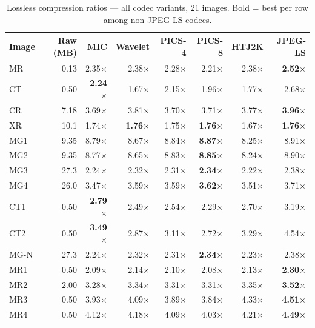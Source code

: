 \documentclass[journal]{IEEEtran}
\begin{document}
\begin{table}[t]
\centering
\caption{Lossless compression ratios --- all codec variants, 21 images. Bold = best per row among non-JPEG-LS codecs.}
\label{tab:ratios}
\begin{tabular}{lrrrrrrr}
\toprule
Image & Raw (MB) & MIC & Wavelet & PICS-4 & PICS-8 & HTJ2K & JPEG-LS \\
\midrule
MR   & 0.13 & 2.35$\times$ & 2.38$\times$ & 2.28$\times$ & 2.21$\times$ & 2.38$\times$ & \textbf{2.52$\times$} \\
CT   & 0.50 & \textbf{2.24$\times$} & 1.67$\times$ & 2.15$\times$ & 1.96$\times$ & 1.77$\times$ & 2.68$\times$ \\
CR   & 7.18 & 3.69$\times$ & 3.81$\times$ & 3.70$\times$ & 3.71$\times$ & 3.77$\times$ & \textbf{3.96$\times$} \\
XR   & 10.1 & 1.74$\times$ & \textbf{1.76$\times$} & 1.75$\times$ & \textbf{1.76$\times$} & 1.67$\times$ & \textbf{1.76$\times$} \\
MG1  & 9.35 & 8.79$\times$ & 8.67$\times$ & 8.84$\times$ & \textbf{8.87$\times$} & 8.25$\times$ & 8.91$\times$ \\
MG2  & 9.35 & 8.77$\times$ & 8.65$\times$ & 8.83$\times$ & \textbf{8.85$\times$} & 8.24$\times$ & 8.90$\times$ \\
MG3  & 27.3 & 2.24$\times$ & 2.32$\times$ & 2.31$\times$ & \textbf{2.34$\times$} & 2.22$\times$ & 2.38$\times$ \\
MG4  & 26.0 & 3.47$\times$ & 3.59$\times$ & 3.59$\times$ & \textbf{3.62$\times$} & 3.51$\times$ & 3.71$\times$ \\
CT1  & 0.50 & \textbf{2.79$\times$} & 2.49$\times$ & 2.54$\times$ & 2.29$\times$ & 2.70$\times$ & 3.19$\times$ \\
CT2  & 0.50 & \textbf{3.49$\times$} & 2.87$\times$ & 3.11$\times$ & 2.72$\times$ & 3.29$\times$ & 4.54$\times$ \\
MG-N & 27.3 & 2.24$\times$ & 2.32$\times$ & 2.31$\times$ & \textbf{2.34$\times$} & 2.23$\times$ & 2.38$\times$ \\
MR1  & 0.50 & 2.09$\times$ & 2.14$\times$ & 2.10$\times$ & 2.08$\times$ & 2.13$\times$ & \textbf{2.30$\times$} \\
MR2  & 2.00 & 3.28$\times$ & 3.34$\times$ & 3.31$\times$ & 3.31$\times$ & 3.35$\times$ & \textbf{3.52$\times$} \\
MR3  & 0.50 & 3.93$\times$ & 4.09$\times$ & 3.89$\times$ & 3.84$\times$ & 4.33$\times$ & \textbf{4.51$\times$} \\
MR4  & 0.50 & 4.12$\times$ & 4.18$\times$ & 4.09$\times$ & 4.03$\times$ & 4.21$\times$ & \textbf{4.49$\times$} \\

\end{tabular}
\end{table}
\end{document}

